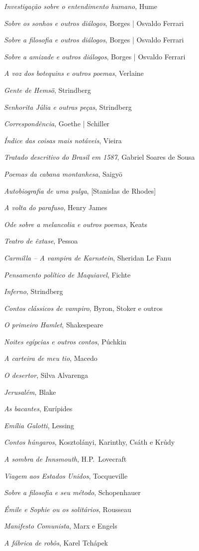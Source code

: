 \begin{enumerate}
{\item \textit{Investigação sobre o entendimento humano}, Hume
\item \textit{Sobre os sonhos e outros diálogos}, Borges | Osvaldo Ferrari
\item \textit{Sobre a filosofia e outros diálogos}, Borges | Osvaldo Ferrari
\item \textit{Sobre a amizade e outros diálogos}, Borges | Osvaldo Ferrari
\item \textit{A voz dos botequins e outros poemas}, Verlaine 
\item \textit{Gente de Hemsö}, Strindberg 
\item \textit{Senhorita Júlia e outras peças}, Strindberg 
\item \textit{Correspondência}, Goethe | Schiller
\item \textit{Índice das coisas mais notáveis}, Vieira
\item \textit{Tratado descritivo do Brasil em 1587}, Gabriel Soares de Sousa
\item \textit{Poemas da cabana montanhesa}, Saigy\=o
\item \textit{Autobiografia de uma pulga}, [Stanislas de Rhodes]
\item \textit{A volta do parafuso}, Henry James
\item \textit{Ode sobre a melancolia e outros poemas}, Keats 
\item \textit{Teatro de êxtase}, Pessoa
\item \textit{Carmilla -- A vampira de Karnstein}, Sheridan Le Fanu
\item \textit{Pensamento político de Maquiavel}, Fichte
\item \textit{Inferno}, Strindberg
\item \textit{Contos clássicos de vampiro}, Byron, Stoker e outros
\item \textit{O primeiro Hamlet}, Shakespeare
\item \textit{Noites egípcias e outros contos}, Púchkin
\item \textit{A carteira de meu tio}, Macedo
\item \textit{O desertor}, Silva Alvarenga
\item \textit{Jerusalém}, Blake
\item \textit{As bacantes}, Eurípides
\item \textit{Emília Galotti}, Lessing
\item \textit{Contos húngaros}, Kosztolányi, Karinthy, Csáth e Krúdy
\item \textit{A sombra de Innsmouth}, H.P.~Lovecraft
\item \textit{Viagem aos Estados Unidos}, Tocqueville
\item \textit{Sobre a filosofia e seu método}, Schopenhauer
\item \textit{Émile e Sophie ou os solitários}, Rousseau 
\item \textit{Manifesto Comunista}, Marx e Engels
\item \textit{A fábrica de robôs}, Karel Tchápek 
\vfill
}%
\end{enumerate}

